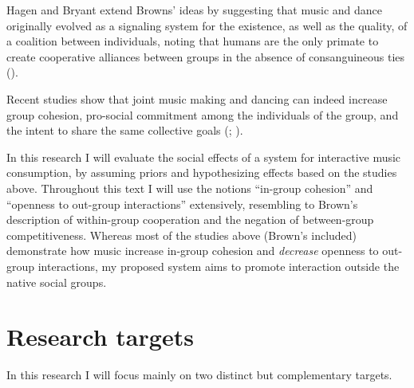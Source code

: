 \documentclass[a4paper,11pt]{article}
\begin{document}
Hagen and Bryant extend Browns' ideas by suggesting that music and dance originally evolved as a signaling system for the existence, as well as the quality, of a coalition between individuals, noting that humans are the only primate to create cooperative alliances between groups in the absence of consanguineous ties (\cite*{Hagen2003}).

Recent studies show that joint music making and dancing can indeed increase group cohesion, pro-social commitment among the individuals of the group, and the intent to share the same collective goals (\cite{Kirschner2010}; \cite{Knoblich2011}).

In this research I will evaluate the social effects of a system for interactive music consumption, by assuming priors and hypothesizing effects based on the studies above.
Throughout this text I will use the notions ``in-group cohesion'' and ``openness to out-group interactions'' extensively, resembling to Brown's description of within-group cooperation and the negation of between-group competitiveness.
Whereas most of the studies above (Brown's included) demonstrate how music increase in-group cohesion and \emph{decrease} openness to out-group interactions, my proposed system aims to promote interaction outside the native social groups.

\section{Research targets}

In this research I will focus mainly on two distinct but complementary targets.
\end{document}
